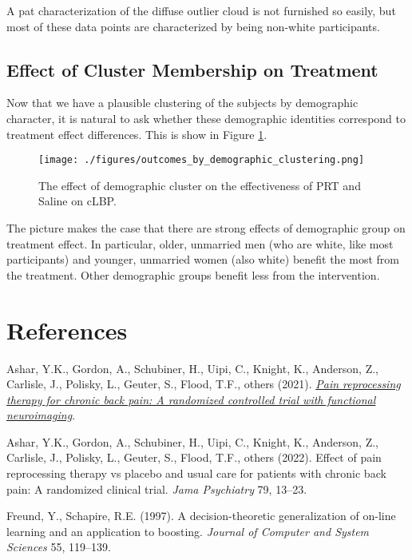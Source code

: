 \documentclass[11pt]{article}
\begin{document}
A pat characterization of the diffuse outlier cloud is not furnished
so easily, but most of these data points are characterized by being
non-white participants.

\subsection{Effect of Cluster Membership on Treatment}
\label{sec:orge4ab3d8}

Now that we have a plausible clustering of the subjects by demographic
character, it is natural to ask whether these demographic identities
correspond to treatment effect differences. This is show in Figure
\ref{fig:org3b2c225}.

\begin{figure}[htbp]
\centering
\texttt{[image: ./figures/outcomes\_by\_demographic\_clustering.png]}
\caption{\label{fig:org3b2c225}The effect of demographic cluster on the effectiveness of PRT and Saline on cLBP.}
\end{figure}

The picture makes the case that there are strong effects of
demographic group on treatment effect. In particular, older, unmarried
men (who are white, like most participants) and younger, unmarried
women (also white) benefit the most from the treatment. Other
demographic groups benefit less from the intervention.

\section{References}
\label{sec:org3bd7fee}

\hypertarget{citeproc_bib_item_1}{Ashar, Y.K., Gordon, A., Schubiner, H., Uipi, C., Knight, K., Anderson, Z., Carlisle, J., Polisky, L., Geuter, S., Flood, T.F., others (2021). \textit{\href{https://figshare.com/s/1840dc4c0e236a7072ca}{Pain reprocessing therapy for chronic back pain: A randomized controlled trial with functional neuroimaging}}.}

\hypertarget{citeproc_bib_item_2}{Ashar, Y.K., Gordon, A., Schubiner, H., Uipi, C., Knight, K., Anderson, Z., Carlisle, J., Polisky, L., Geuter, S., Flood, T.F., others (2022). Effect of pain reprocessing therapy vs placebo and usual care for patients with chronic back pain: A randomized clinical trial. \textit{Jama Psychiatry} 79, 13–23.}

\hypertarget{citeproc_bib_item_3}{Freund, Y., Schapire, R.E. (1997). A decision-theoretic generalization of on-line learning and an application to boosting. \textit{Journal of Computer and System Sciences} 55, 119–139.}
\end{document}
